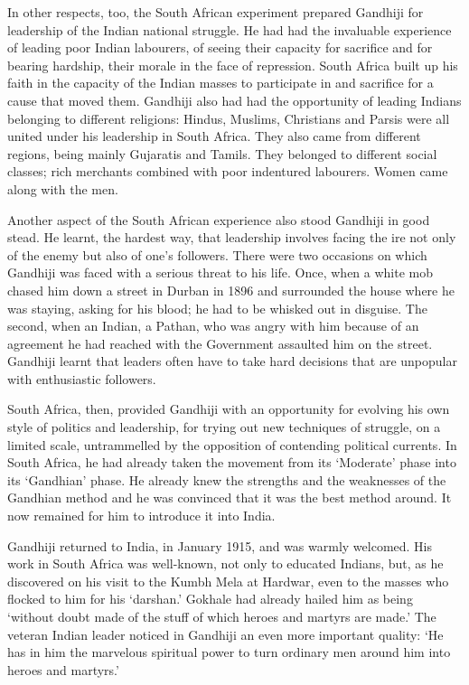 \begin{multicols}{2}
In other respects, too, the South African experiment prepared Gandhiji for leadership of the Indian national struggle. He had had the invaluable experience of leading poor Indian labourers, of seeing their capacity for sacrifice and for bearing hardship, their morale in the face of repression. South Africa built up his faith in the capacity of the Indian masses to participate in and sacrifice for a cause that moved them. Gandhiji also had had the opportunity of leading Indians belonging to different religions: Hindus, Muslims, Christians and Parsis were all united under his leadership in South Africa. They also came from different regions, being mainly Gujaratis and Tamils. They belonged to different social classes; rich merchants combined with poor indentured labourers. Women came along with the men.

Another aspect of the South African experience also stood Gandhiji in good stead. He learnt, the hardest way, that leadership involves facing the ire not only of the enemy but also of one's followers. There were two occasions on which Gandhiji was faced with a serious threat to his life. Once, when a white mob chased him down a street in Durban in 1896 and surrounded the house where he was staying, asking for his blood; he had to be whisked out in disguise. The second, when an Indian, a Pathan, who was angry with him because of an agreement he had reached with the Government assaulted him on the street. Gandhiji learnt that leaders often have to take hard decisions that are unpopular with enthusiastic followers.

South Africa, then, provided Gandhiji with an opportunity for evolving his own style of politics and leadership, for trying out new techniques of struggle, on a limited scale, untrammelled by the opposition of contending political currents. In South Africa, he had already taken the movement from its `Moderate' phase into its `Gandhian' phase. He already knew the strengths and the weaknesses of the Gandhian method and he was convinced that it was the best method around. It now remained for him to introduce it into India.

Gandhiji returned to India, in January 1915, and was warmly welcomed. His work in South Africa was well-known, not only to educated Indians, but, as he discovered on his visit to the Kumbh Mela at Hardwar, even to the masses who flocked to him for his `darshan.' Gokhale had already hailed him as being `without doubt made of the stuff of which heroes and martyrs are made.' The veteran Indian leader noticed in Gandhiji an even more important quality: `He has in him the marvelous spiritual power to turn ordinary men around him into heroes and martyrs.'


\end{multicols}
